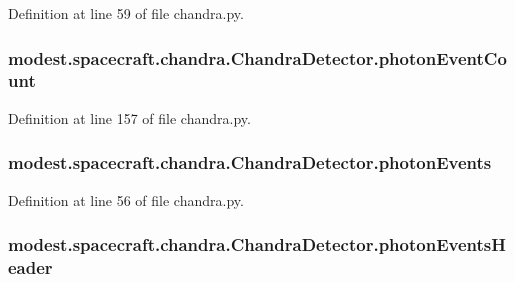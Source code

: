 Definition at line 59 of file chandra.\+py.

\subsubsection[{\texorpdfstring{photon\+Event\+Count}{photonEventCount}}]{\setlength{\rightskip}{0pt plus 5cm}modest.\+spacecraft.\+chandra.\+Chandra\+Detector.\+photon\+Event\+Count}\hypertarget{classmodest_1_1spacecraft_1_1chandra_1_1ChandraDetector_a3e4c6570287462c64b9aae54c28d1b03}{}\label{classmodest_1_1spacecraft_1_1chandra_1_1ChandraDetector_a3e4c6570287462c64b9aae54c28d1b03}


Definition at line 157 of file chandra.\+py.

\subsubsection[{\texorpdfstring{photon\+Events}{photonEvents}}]{\setlength{\rightskip}{0pt plus 5cm}modest.\+spacecraft.\+chandra.\+Chandra\+Detector.\+photon\+Events}\hypertarget{classmodest_1_1spacecraft_1_1chandra_1_1ChandraDetector_ac7c43945033c49fd9019269d724bf173}{}\label{classmodest_1_1spacecraft_1_1chandra_1_1ChandraDetector_ac7c43945033c49fd9019269d724bf173}


Definition at line 56 of file chandra.\+py.

\subsubsection[{\texorpdfstring{photon\+Events\+Header}{photonEventsHeader}}]{\setlength{\rightskip}{0pt plus 5cm}modest.\+spacecraft.\+chandra.\+Chandra\+Detector.\+photon\+Events\+Header}\hypertarget{classmodest_1_1spacecraft_1_1chandra_1_1ChandraDetector_aec4bcd6338c7314387b5b7be08117d4b}{}\label{classmodest_1_1spacecraft_1_1chandra_1_1ChandraDetector_aec4bcd6338c7314387b5b7be08117d4b}


